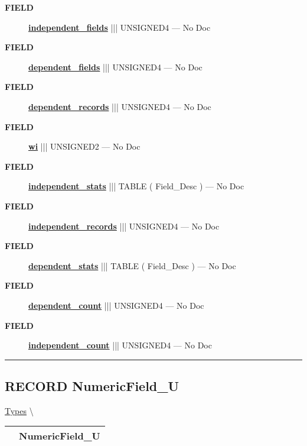 \par
\begin{description}
\item [\colorbox{tagtype}{\color{white} \textbf{\textsf{FIELD}}}] \textbf{\underline{independent\_fields}} ||| UNSIGNED4 --- No Doc
\item [\colorbox{tagtype}{\color{white} \textbf{\textsf{FIELD}}}] \textbf{\underline{dependent\_fields}} ||| UNSIGNED4 --- No Doc
\item [\colorbox{tagtype}{\color{white} \textbf{\textsf{FIELD}}}] \textbf{\underline{dependent\_records}} ||| UNSIGNED4 --- No Doc
\item [\colorbox{tagtype}{\color{white} \textbf{\textsf{FIELD}}}] \textbf{\underline{wi}} ||| UNSIGNED2 --- No Doc
\item [\colorbox{tagtype}{\color{white} \textbf{\textsf{FIELD}}}] \textbf{\underline{independent\_stats}} ||| TABLE ( Field\_Desc ) --- No Doc
\item [\colorbox{tagtype}{\color{white} \textbf{\textsf{FIELD}}}] \textbf{\underline{independent\_records}} ||| UNSIGNED4 --- No Doc
\item [\colorbox{tagtype}{\color{white} \textbf{\textsf{FIELD}}}] \textbf{\underline{dependent\_stats}} ||| TABLE ( Field\_Desc ) --- No Doc
\item [\colorbox{tagtype}{\color{white} \textbf{\textsf{FIELD}}}] \textbf{\underline{dependent\_count}} ||| UNSIGNED4 --- No Doc
\item [\colorbox{tagtype}{\color{white} \textbf{\textsf{FIELD}}}] \textbf{\underline{independent\_count}} ||| UNSIGNED4 --- No Doc
\end{description}





\rule{\linewidth}{0.5pt}
\subsection*{\textsf{\colorbox{headtoc}{\color{white} RECORD}
NumericField\_U}}

\hypertarget{ecldoc:logisticregression.types.numericfield_u}{}
\hspace{0pt} \hyperlink{ecldoc:LogisticRegression.Types}{Types} \textbackslash 

{\renewcommand{\arraystretch}{1.5}
\begin{tabularx}{\textwidth}{|>{\raggedright\arraybackslash}l|X|}
\hline
\hspace{0pt}\mytexttt{\color{red} } & \textbf{NumericField\_U} \\
\hline
\end{tabularx}
}

